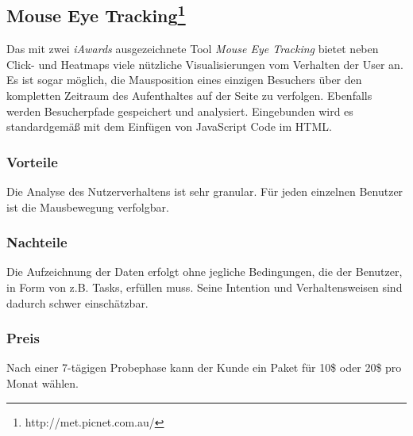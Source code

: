 \subsection*{Mouse Eye Tracking\texttrademark \footnote{http://met.picnet.com.au/}}

Das mit zwei \textit{iAwards} ausgezeichnete Tool \textit{Mouse Eye Tracking\texttrademark} bietet neben Click- und Heatmaps viele nützliche Visualisierungen vom Verhalten der User an. Es ist sogar möglich, die Mausposition eines einzigen Besuchers über den kompletten Zeitraum des Aufenthaltes auf der Seite zu verfolgen. Ebenfalls werden Besucherpfade gespeichert und analysiert. Eingebunden wird es standardgemäß mit dem Einfügen von JavaScript Code im HTML.

\subsubsection*{Vorteile}
Die Analyse des Nutzerverhaltens ist sehr granular. Für jeden einzelnen Benutzer ist die Mausbewegung verfolgbar.

\subsubsection*{Nachteile}
Die Aufzeichnung der Daten erfolgt ohne jegliche Bedingungen, die der Benutzer, in Form von z.B. Tasks, erfüllen muss. Seine Intention und Verhaltensweisen sind dadurch schwer einschätzbar.

\subsubsection*{Preis}
Nach einer 7-tägigen Probephase kann der Kunde ein Paket für 10\$ oder 20\$ pro Monat wählen.















